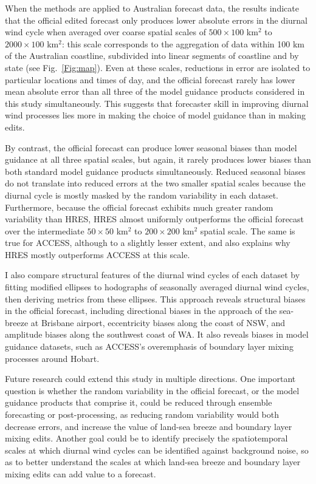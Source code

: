 \documentclass[twocol]{ametsoc}
\begin{document}
When the methods are applied to Australian forecast data, the results indicate that the official edited forecast only produces lower absolute errors in the diurnal wind cycle when averaged over coarse spatial scales of $500\times 100$ km$^{2}$ to $2000 \times 100$ km$^{2}$: this scale corresponds to the aggregation of data within 100 km of the Australian coastline, subdivided into linear segments of coastline and by state (see Fig.~\ref{Fig:map}). Even at these scales, reductions in error are isolated to particular locations and times of day, and the official forecast rarely has lower mean absolute error than all three of the model guidance products considered in this study simultaneously. This suggests that forecaster skill in improving diurnal wind processes lies more in making the choice of model guidance than in making edits.

By contrast, the official forecast can produce lower seasonal biases than model guidance at all three spatial scales, but again, it rarely produces lower biases than both standard model guidance products simultaneously. Reduced seasonal biases do not translate into reduced errors at the two smaller spatial scales because the diurnal cycle is mostly masked by the random variability in each dataset. Furthermore, because the official forecast exhibits much greater random variability than HRES, HRES almost uniformly outperforms the official forecast over the intermediate $50\times 50$ km$^{2}$ to $200 \times 200$ km$^{2}$ spatial scale. The same is true for ACCESS, although to a slightly lesser extent, and also explains why HRES mostly outperforms ACCESS at this scale. 

I also compare structural features of the diurnal wind cycles of each dataset by fitting modified ellipses to hodographs of seasonally averaged diurnal wind cycles, then deriving metrics from these ellipses. This approach reveals structural biases in the official forecast, including directional biases in the approach of the sea-breeze at Brisbane airport, eccentricity biases along the coast of NSW, and amplitude biases along the southwest coast of WA. It also reveals biases in model guidance datasets, such as ACCESS's overemphasis of boundary layer mixing processes around Hobart.   

Future research could extend this study in multiple directions. One important question is whether the random variability in the official forecast, or the model guidance products that comprise it, could be reduced through ensemble forecasting or post-processing, as reducing random variability would both decrease errors, and increase the value of land-sea breeze and boundary layer mixing edits. Another goal could be to identify precisely the spatiotemporal scales at which diurnal wind cycles can be identified against background noise, so as to better understand the scales at which land-sea breeze and boundary layer mixing edits can add value to a forecast.  
\end{document}
